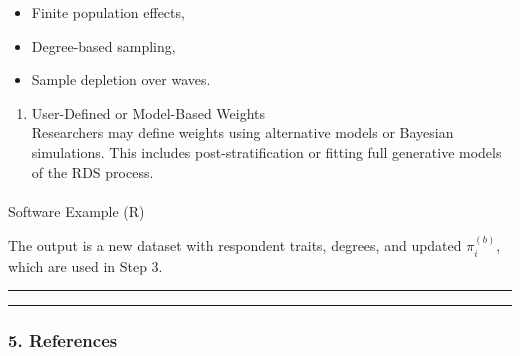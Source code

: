 \documentclass[
  12pt,
  letterpaper,
  DIV=11,
  numbers=noendperiod]{scrartcl}
\makeatletter
\let\oldparagraph\paragraph
\renewcommand{\paragraph}{
    \@ifstar
      \xxxParagraphStar
      \xxxParagraphNoStar
  }
\newcommand{\xxxParagraphStar}[1]{\oldparagraph*{#1}\mbox{}}
\newcommand{\xxxParagraphNoStar}[1]{\oldparagraph{#1}\mbox{}}
\newenvironment{Shaded}{\begin{snugshade}}{\end{snugshade}}
\newcommand{\AttributeTok}[1]{\textcolor[rgb]{0.40,0.45,0.13}{#1}}
\newcommand{\DecValTok}[1]{\textcolor[rgb]{0.68,0.00,0.00}{#1}}
\newcommand{\FunctionTok}[1]{\textcolor[rgb]{0.28,0.35,0.67}{#1}}
\newcommand{\NormalTok}[1]{\textcolor[rgb]{0.00,0.23,0.31}{#1}}
\newcommand{\OtherTok}[1]{\textcolor[rgb]{0.00,0.23,0.31}{#1}}
\newcommand{\SpecialCharTok}[1]{\textcolor[rgb]{0.37,0.37,0.37}{#1}}
\newcommand{\StringTok}[1]{\textcolor[rgb]{0.13,0.47,0.30}{#1}}
\providecommand{\tightlist}{%
  \setlength{\itemsep}{0pt}\setlength{\parskip}{0pt}}
\theoremstyle{plain}
\theoremstyle{definition}
\makeatother
\begin{document}
\begin{itemize}
\item
  Finite population effects,
\item
  Degree-based sampling,
\item
  Sample depletion over waves.
\end{itemize}

\begin{enumerate}
\def\labelenumi{(\alph{enumi})}
\setcounter{enumi}{2}
\tightlist
\item
  User-Defined or Model-Based Weights\\
  Researchers may define weights using alternative models or Bayesian
  simulations. This includes post-stratification or fitting full
  generative models of the RDS process.
\end{enumerate}

\paragraph{Software Example (R)}\label{software-example-r}

\begin{Shaded}
\end{Shaded}

The output is a new dataset with respondent traits, degrees, and updated
\(\pi_i^{(b)}\), which are used in Step 3.

\begin{center}\rule{0.5\linewidth}{0.5pt}\end{center}

\begin{center}\rule{0.5\linewidth}{0.5pt}\end{center}

\subsubsection{5. References}\label{references-1}
\end{document}

